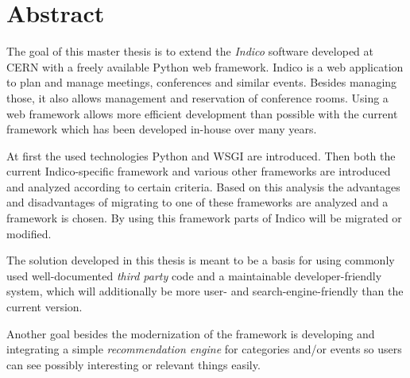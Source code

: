 \chapter*{Abstract}
\thispagestyle{empty}

The goal of this master thesis is to extend the \emph{Indico} software developed at CERN with a
freely available Python web framework. Indico is a web application to plan and manage meetings,
conferences and similar events. Besides managing those, it also allows management and reservation of
conference rooms. Using a web framework allows more efficient development than possible with the
current framework which has been developed in-house over many years.

At first the used technologies Python and WSGI are introduced. Then both the current
Indico-specific framework and various other frameworks are introduced and analyzed according to
certain criteria. Based on this analysis the advantages and disadvantages of migrating to one of
these frameworks are analyzed and a framework is chosen. By using this framework parts of Indico
will be migrated or modified.

The solution developed in this thesis is meant to be a basis for using commonly used well-documented
\emph{third party} code and a maintainable developer-friendly system, which will additionally be
more user- and search-engine-friendly than the current version.

Another goal besides the modernization of the framework is developing and integrating a simple
\emph{recommendation engine} for categories and/or events so users can see possibly interesting or
relevant things easily.

